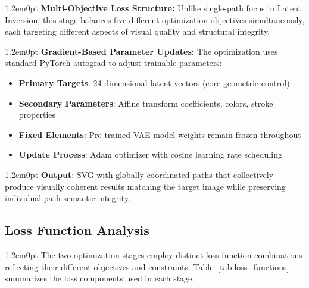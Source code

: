 \documentclass[10pt,a4paper]{article}
\newenvironment{bodytext}{\begin{adjustwidth}{1.2em}{0pt}}{\end{adjustwidth}}
\begin{document}
\begin{bodytext}
\textbf{Multi-Objective Loss Structure:} Unlike single-path focus in Latent Inversion, this stage balances five different optimization objectives simultaneously, each targeting different aspects of visual quality and structural integrity.
\end{bodytext}

\begin{bodytext}
\textbf{Gradient-Based Parameter Updates:} The optimization uses standard PyTorch autograd to adjust trainable parameters:
\begin{itemize}
\item \textbf{Primary Targets}: 24-dimensional latent vectors (core geometric control)
\item \textbf{Secondary Parameters}: Affine transform coefficients, colors, stroke properties
\item \textbf{Fixed Elements}: Pre-trained VAE model weights remain frozen throughout
\item \textbf{Update Process}: Adam optimizer with cosine learning rate scheduling
\end{itemize}
\end{bodytext}

\begin{bodytext}
\textbf{Output}: SVG with globally coordinated paths that collectively produce visually coherent results matching the target image while preserving individual path semantic integrity.
\end{bodytext}

\subsection{Loss Function Analysis}

\begin{bodytext}
The two optimization stages employ distinct loss function combinations reflecting their different objectives and constraints. Table~\ref{tab:loss_functions} summarizes the loss components used in each stage.
\end{bodytext}
\end{document}
